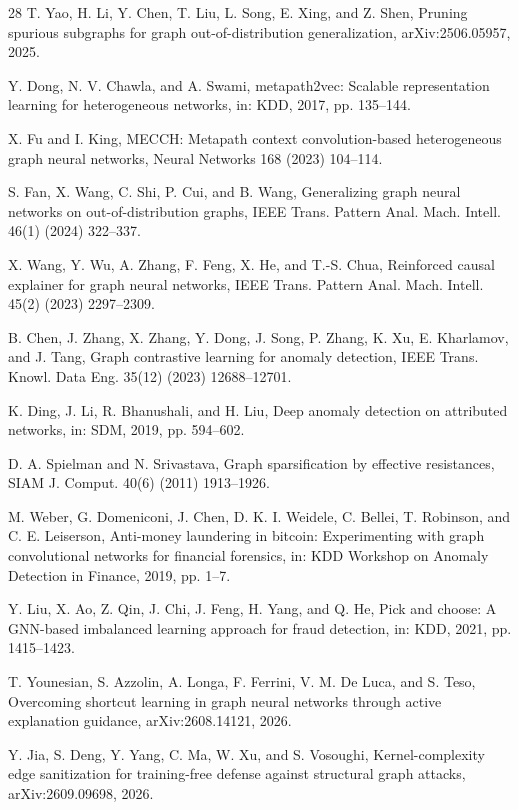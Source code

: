 \documentclass[11pt]{article}
\begin{document}
\begin{thebibliography}{28}
T. Yao, H. Li, Y. Chen, T. Liu, L. Song, E. Xing, and Z. Shen, Pruning spurious subgraphs for graph out-of-distribution generalization, arXiv:2506.05957, 2025.

Y. Dong, N. V. Chawla, and A. Swami, metapath2vec: Scalable representation learning for heterogeneous networks, in: KDD, 2017, pp. 135--144.

X. Fu and I. King, MECCH: Metapath context convolution-based heterogeneous graph neural networks, Neural Networks 168 (2023) 104--114.

S. Fan, X. Wang, C. Shi, P. Cui, and B. Wang, Generalizing graph neural networks on out-of-distribution graphs, IEEE Trans. Pattern Anal. Mach. Intell. 46(1) (2024) 322--337.

X. Wang, Y. Wu, A. Zhang, F. Feng, X. He, and T.-S. Chua, Reinforced causal explainer for graph neural networks, IEEE Trans. Pattern Anal. Mach. Intell. 45(2) (2023) 2297--2309.

B. Chen, J. Zhang, X. Zhang, Y. Dong, J. Song, P. Zhang, K. Xu, E. Kharlamov, and J. Tang, Graph contrastive learning for anomaly detection, IEEE Trans. Knowl. Data Eng. 35(12) (2023) 12688--12701.

K. Ding, J. Li, R. Bhanushali, and H. Liu, Deep anomaly detection on attributed networks, in: SDM, 2019, pp. 594--602.

D. A. Spielman and N. Srivastava, Graph sparsification by effective resistances, SIAM J. Comput. 40(6) (2011) 1913--1926.

M. Weber, G. Domeniconi, J. Chen, D. K. I. Weidele, C. Bellei, T. Robinson, and C. E. Leiserson, Anti-money laundering in bitcoin: Experimenting with graph convolutional networks for financial forensics, in: KDD Workshop on Anomaly Detection in Finance, 2019, pp. 1--7.

Y. Liu, X. Ao, Z. Qin, J. Chi, J. Feng, H. Yang, and Q. He, Pick and choose: A GNN-based imbalanced learning approach for fraud detection, in: KDD, 2021, pp. 1415--1423.

T. Younesian, S. Azzolin, A. Longa, F. Ferrini, V. M. De Luca, and S. Teso, Overcoming shortcut learning in graph neural networks through active explanation guidance, arXiv:2608.14121, 2026.

Y. Jia, S. Deng, Y. Yang, C. Ma, W. Xu, and S. Vosoughi, Kernel-complexity edge sanitization for training-free defense against structural graph attacks, arXiv:2609.09698, 2026.


\end{thebibliography}
\end{document}
